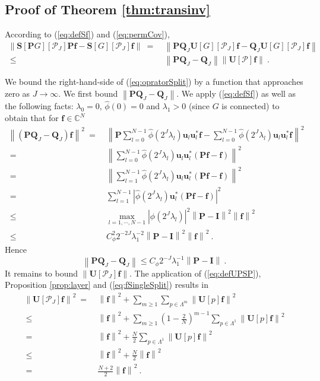 \documentclass{article}
\def\l{\lambda}
\def\CC{\mathbb{C}}
\def\cP{\mathcal{P}}
\def\BI{\boldsymbol{I}}
\def\BP{\boldsymbol{P}}
\def\BQ{\boldsymbol{Q}}
\def\BS{\boldsymbol{S}}
\def\BU{\boldsymbol{U}}
\def\Bf{\boldsymbol{f}}
\def\Bu{\boldsymbol{u}}
\newcommand{\abs}[1]{\left| #1 \right|}
\newcommand{\norm}[1]{\left\lVert#1\right\rVert}
\begin{document}
\subsection{Proof of Theorem \ref{thm:transinv}}\label{subsec:prooftransinv}
According to (\ref{eq:defSf}) and (\ref{eq:permCov}),
\begin{equation}\label{eq:opratorSplit}
\begin{aligned}
\norm{\BS[\BP G][\cP_J] \BP \Bf - \BS[G][\cP_J] \Bf} ~=~ & \norm{\BP \BQ_J \BU[G][\cP_J] \Bf - \BQ_J \BU[G][\cP_J] \Bf} \\
~\leq~ & \norm{\BP \BQ_J -  \BQ_J} \norm{\BU[\cP] \Bf} ~.
\end{aligned}
\end{equation}

We bound the right-hand-side of (\ref{eq:opratorSplit}) by a function that approaches zero as $J \rightarrow \infty$. We first bound $\norm{\BP \BQ_J -  \BQ_J}$. 
We apply (\ref{eq:defSf}) as well as the following facts: $\l_0 = 0$, $\hat{\phi}(0) = 0$ and $\l_1 > 0$ (since $G$ is connected) to obtain that for $\Bf \in \CC^N$
\begin{equation}
\begin{aligned}
\norm{(\BP \BQ_J - \BQ_J) \Bf}^2 ~=~ & \norm{\BP \sum_{l=0}^{N-1} \hat{\phi}(2^J \l_l) \Bu_l \Bu_l^* \Bf - \sum_{l=0}^{N-1} \hat{\phi}(2^J \l_l) \Bu_l \Bu_l^* \Bf}^2 \\
~=~ & \norm{\sum_{l=0}^{N-1} \hat{\phi}(2^J \l_l) \Bu_l \Bu_l^* (\BP\Bf-\Bf)}^2 \\
~=~ & \norm{\sum_{l=1}^{N-1} \hat{\phi}(2^J \l_l) \Bu_l \Bu_l^* (\BP\Bf-\Bf)}^2 \\
~=~ & \sum_{l=1}^{N-1} \abs{\hat{\phi}(2^J \l_l) \Bu_l^* (\BP\Bf-\Bf)}^2 \\
~\leq~ & \max_{l=1, \cdots, N-1} \abs{\hat{\phi}(2^J \l_l)}^2 \norm{\BP-\BI}^2 \norm{\Bf}^2 \\
~\leq~ & C_{\phi}^2 2^{-2J} \l_1^{-2} \norm{\BP-\BI}^2 \norm{\Bf}^2 ~.
\end{aligned}
\end{equation}
Hence
\begin{equation}
\label{eq:assist2_app_inv}
\norm{\BP \BQ_J - \BQ_J} \leq C_{\phi} 2^{-J} \l_1^{-1} \norm{\BP-\BI} ~.
\end{equation}
It remains to bound $\norm{\BU[\cP_J] \Bf}$. 
The application of (\ref{eq:defUPSP}), Proposition \ref{prop:layer} and (\ref{eq:fSingleSplit}) results in 
\begin{equation}
\label{eq:assist3_app_inv}
\begin{aligned}
\norm{\BU[\cP_J] \Bf}^2 ~=~ & \norm{\Bf}^2 + \sum_{m \geq 1} \sum_{p \in \Lambda^m} \norm{\BU[p] \Bf}^2 \\
~\leq~ & \norm{\Bf}^2 + \sum_{m \geq 1} \left( 1 - \frac{2}{N} \right)^{m-1} \sum_{p \in \Lambda^1} \norm{\BU[p] \Bf}^2 \\
~=~ & \norm{\Bf}^2 + \frac{N}{2} \sum_{p \in \Lambda^1} \norm{\BU[p] \Bf}^2 \\
~\leq~ & \norm{\Bf}^2 + \frac{N}{2} \norm{\Bf}^2 \\
~=~ & \frac{N+2}{2} \norm{\Bf}^2 ~.
\end{aligned}
\end{equation}
\end{document}
